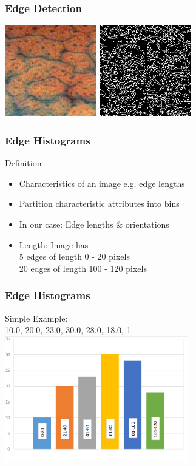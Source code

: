 \documentclass{beamer}
\begin{document}
\begin{frame}
	\frametitle{Edge Detection}
	\includegraphics[width = 4cm]{after_1.jpg}
	\includegraphics[width = 4cm]{edges_detected.png}		
\end{frame}

\begin{frame}
	\frametitle{Edge Histograms}
	\begin{block}{Definition}
		\begin{itemize}
			\item Characteristics of an image e.g. edge lengths
			\item Partition characteristic attributes into bins
			\item In our case: Edge lengths \& orientations
			\item Length: Image has\\
			5 edges of length 0 - 20 pixels\\
			20 edges of length 100 - 120 pixels
		\end{itemize}
	\end{block}
	
\end{frame}

\begin{frame}
	\frametitle{Edge Histograms}
	Simple Example:\\
	10.0, 20.0, 23.0, 30.0, 28.0, 18.0, 1\\
	\includegraphics[width = 8cm]{histogram.png}	
	
\end{frame}
\end{document}
